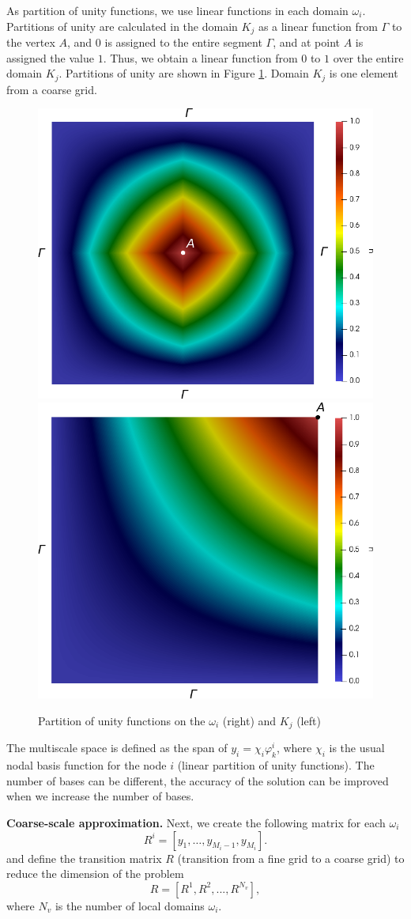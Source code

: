 \documentclass[10pt]{article}
\begin{document}
As  partition of unity functions, we use linear functions in each domain $\omega_i$.
Partitions of unity are calculated in the domain $ K_j $ as a linear function from $\Gamma$ to the vertex $ A $, and $ 0 $ is assigned to the entire segment $\Gamma$, and at point $ A $ is assigned the value $1$. 
Thus, we obtain a linear function from $ 0 $ to $ 1 $ over the entire domain $ K_j $. 
Partitions of unity are shown in Figure \ref{p2}. 
Domain $K_j$  is one element from a coarse grid. 
\begin{figure}[h!]
\centering
\includegraphics[width=0.45\linewidth]{pofs.png} 
\hspace{2em}
\includegraphics[width=0.45\linewidth]{pouK.png} 
\caption{Partition of unity functions on the $\omega_i$ (right) and $K_j$ (left)}
\label{p2}
\end{figure} 
 
The multiscale space is defined as the span of $y_i = \chi_i \varphi^i_k$, where $\chi_i$ is the usual nodal basis function for the node $i$ (linear partition of unity functions). 
The number of bases can be different, the accuracy of the solution can be improved when we increase the number of bases.

\textbf{Coarse-scale approximation. }
Next, we create the following  matrix for each $\omega_i$
\[
R^i = \left[ y_1, \ldots, y_{M_i-1},  y_{M_i} \right].
\]
and define the transition matrix $R$ (transition from a fine grid to a coarse grid) to reduce the dimension of the problem
\[
R = [ R^1, R^2, ..., R^{N_v} ],
\]
where $N_v$ is the number of local domains $\omega_i$.
\end{document}
